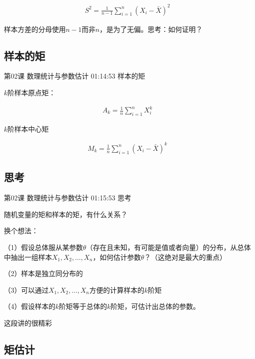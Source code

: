 \documentclass[UTF8]{ctexbook}
\begin{document}
\begin{equation}
\begin{aligned}
S^{2}=\frac{1}{n-1}\sum_{i=1}^{n}(X_{i}-\bar{X})^{2}
\end{aligned}
\end{equation}

样本方差的分母使用$n-1$而非$n$，是为了无偏。思考：如何证明？

\subsection{样本的矩}

第02课 数理统计与参数估计 01:14:53 样本的矩

$k$阶样本原点矩：

\begin{equation}
\begin{aligned}
A_{k}=\frac{1}{n}\sum_{i=1}^{n}X_{i}^{k}
\end{aligned}
\end{equation}

$k$阶样本中心矩

\begin{equation}
\begin{aligned}
M_{k}=\frac{1}{n}\sum_{i=1}^{n}(X_{i}-\bar{X})^{k}
\end{aligned}
\end{equation}

\subsection{思考}

第02课 数理统计与参数估计 01:15:53 思考

随机变量的矩和样本的矩，有什么关系？

换个想法：

（1）假设总体服从某参数$\theta$（存在且未知，有可能是值或者向量）的分布，从总体中抽出一组样本$X_{1},X_{2},\dots,X_{n}$，如何估计参数$\theta$？（这绝对是最大的重点）

（2）样本是独立同分布的

（3）可以通过$X_ {1},X_{2},\dots,X_{n}$方便的计算样本的$k$阶矩

（4）假设样本的$k$阶矩等于总体的$k$阶矩，可估计出总体的参数。

这段讲的很精彩

\subsection{矩估计}
\end{document}
